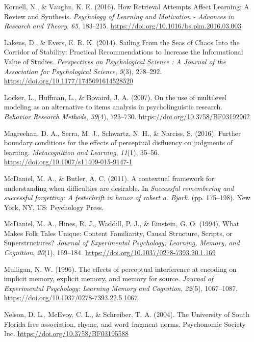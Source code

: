 \documentclass[english,pdf]{apa6}
\begin{document}
\leavevmode\hypertarget{ref-Kornell2016}{}%
Kornell, N., \& Vaughn, K. E. (2016). How Retrieval Attempts Affect Learning: A Review and Synthesis. \emph{Psychology of Learning and Motivation - Advances in Research and Theory}, \emph{65}, 183--215. \url{https://doi.org/10.1016/bs.plm.2016.03.003}

\leavevmode\hypertarget{ref-Lakens2014}{}%
Lakens, D., \& Evers, E. R. K. (2014). Sailing From the Seas of Chaos Into the Corridor of Stability: Practical Recommendations to Increase the Informational Value of Studies. \emph{Perspectives on Psychological Science : A Journal of the Association for Psychological Science}, \emph{9}(3), 278--292. \url{https://doi.org/10.1177/1745691614528520}

\leavevmode\hypertarget{ref-Locker2007}{}%
Locker, L., Huffman, L., \& Bovaird, J. A. (2007). On the use of multilevel modeling as an alternative to items analysis in psycholinguistic research. \emph{Behavior Research Methods}, \emph{39}(4), 723--730. \url{https://doi.org/10.3758/BF03192962}

\leavevmode\hypertarget{ref-Magreehan2016}{}%
Magreehan, D. A., Serra, M. J., Schwartz, N. H., \& Narciss, S. (2016). Further boundary conditions for the effects of perceptual disfluency on judgments of learning. \emph{Metacognition and Learning}, \emph{11}(1), 35--56. \url{https://doi.org/10.1007/s11409-015-9147-1}

\leavevmode\hypertarget{ref-McDaniel2011}{}%
McDaniel, M. A., \& Butler, A. C. (2011). A contextual framework for understanding when difficulties are desirable. In \emph{Successful remembering and successful forgetting: A festschrift in honor of robert a. Bjork.} (pp. 175--198). New York, NY, US: Psychology Press.

\leavevmode\hypertarget{ref-McDaniel1994}{}%
McDaniel, M. A., Hines, R. J., Waddill, P. J., \& Einstein, G. O. (1994). What Makes Folk Tales Unique: Content Familiarity, Causal Structure, Scripts, or Superstructures? \emph{Journal of Experimental Psychology: Learning, Memory, and Cognition}, \emph{20}(1), 169--184. \url{https://doi.org/10.1037/0278-7393.20.1.169}

\leavevmode\hypertarget{ref-Mulligan1996}{}%
Mulligan, N. W. (1996). The effects of perceptual interference at encoding on implicit memory, explicit memory, and memory for source. \emph{Journal of Experimental Psychology: Learning Memory and Cognition}, \emph{22}(5), 1067--1087. \url{https://doi.org/10.1037/0278-7393.22.5.1067}

\leavevmode\hypertarget{ref-Nelson2004}{}%
Nelson, D. L., McEvoy, C. L., \& Schreiber, T. A. (2004). The University of South Florida free association, rhyme, and word fragment norms. Psychonomic Society Inc. \url{https://doi.org/10.3758/BF03195588}
\end{document}
